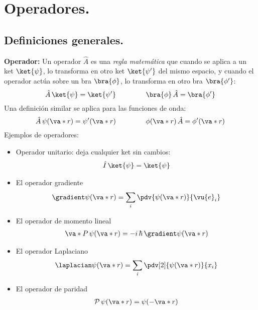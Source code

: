 \section{Operadores.}
\subsection{Definiciones generales.}
\textbf{Operador: } Un operador $\hat{A}$ es una \emph{regla matemática} que cuando se aplica a un ket $\ket{\psi}$, lo transforma en otro ket $\ket{\psi^{\prime}}$ del mismo espacio, y cuando el operador actúa sobre un bra $\bra{\phi}$, lo transforma en otro bra $\bra{\phi^{\prime}}$:
\begin{equation}
\hat{A} \, \ket{\psi} = \ket{\psi^{\prime}} \hspace{1.5cm} \bra{\phi} \, \hat{A} = \bra{\phi^{\prime}}
\label{eq:ecuacion_02_51}
\end{equation}
Una definición similar se aplica para las funciones de onda:
\begin{equation}
\hat{A} \, \psi(\va*{r}) =  \psi^{\prime} (\va*{r}) \hspace{1.5cm} \phi(\va*{r}) \, \hat{A} =  \phi^{\prime} (\va*{r})
\label{eq:ecuacion_02_52}
\end{equation}
Ejemplos de operadores:
\begin{itemize}
\item Operador unitario: deja cualquier ket sin cambios:
\begin{align*}
\hat{I} \, \ket{\psi} = \ket{\psi}
\end{align*}
\item El operador gradiente
\begin{align*}
\gradient \psi(\va*{r}) = \sum_{i} \pdv{\psi(\va*{r})}{\vu{e}_{i}}
\end{align*}
\item El operador de momento lineal
\begin{align*}
\va*{P} \, \psi(\va*{r}) =  - i \, \hbar \, \gradient \psi(\va*{r})
\end{align*}
\item El operador Laplaciano
\begin{align*}
\laplacian \psi(\va*{r}) = \sum_{i} \pdv[2]{\psi(\va*{r})}{x_{i}}
\end{align*}
\item El operador de paridad
\begin{align*}
\mathcal{P} \, \psi(\va*{r}) = \psi(- \va*{r}) 
\end{align*}
\end{itemize}

